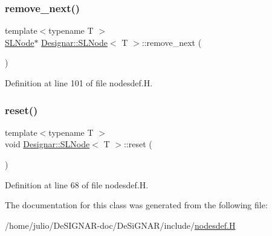 \mbox{\label{class_designar_1_1_s_l_node_aa12ebd41228f87e9df06d5e74b7111e6}} 
\subsubsection{\texorpdfstring{remove\+\_\+next()}{remove\_next()}}
{\footnotesize\ttfamily template$<$typename T $>$ \\
\hyperlink{class_designar_1_1_s_l_node}{S\+L\+Node}$\ast$ \hyperlink{class_designar_1_1_s_l_node}{Designar\+::\+S\+L\+Node}$<$ T $>$\+::remove\+\_\+next (\begin{DoxyParamCaption}{ }\end{DoxyParamCaption})\hspace{0.3cm}{\ttfamily [inline]}}



Definition at line 101 of file nodesdef.\+H.

\mbox{\label{class_designar_1_1_s_l_node_ad837fcbb2d5d1fb1c7aa51392f6fdaae}} 
\subsubsection{\texorpdfstring{reset()}{reset()}}
{\footnotesize\ttfamily template$<$typename T $>$ \\
void \hyperlink{class_designar_1_1_s_l_node}{Designar\+::\+S\+L\+Node}$<$ T $>$\+::reset (\begin{DoxyParamCaption}{ }\end{DoxyParamCaption})\hspace{0.3cm}{\ttfamily [inline]}}



Definition at line 68 of file nodesdef.\+H.



The documentation for this class was generated from the following file\+:\begin{DoxyCompactItemize}
\item 
/home/julio/\+De\+S\+I\+G\+N\+A\+R-\/doc/\+De\+Si\+G\+N\+A\+R/include/\hyperlink{nodesdef_8_h}{nodesdef.\+H}\end{DoxyCompactItemize}
